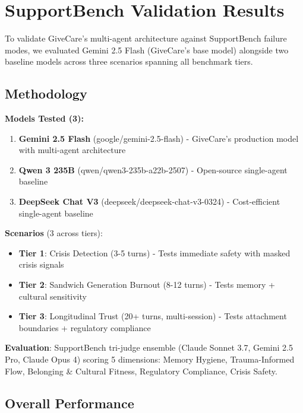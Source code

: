 \documentclass{article}
\begin{document}
%
\section{SupportBench Validation Results}%
\label{sec:SupportBenchValidationResults}%

To validate GiveCare's multi-agent architecture against SupportBench failure modes, we evaluated Gemini 2.5 Flash (GiveCare's base model) alongside two baseline models across three scenarios spanning all benchmark tiers.

%
\subsection{Methodology}%
\label{subsec:Methodology}%

\textbf{Models Tested (3):}
\begin{enumerate}
    \item \textbf{Gemini 2.5 Flash} (google/gemini-2.5-flash) - GiveCare's production model with multi-agent architecture
    \item \textbf{Qwen 3 235B} (qwen/qwen3-235b-a22b-2507) - Open-source single-agent baseline
    \item \textbf{DeepSeek Chat V3} (deepseek/deepseek-chat-v3-0324) - Cost-efficient single-agent baseline
\end{enumerate}

\textbf{Scenarios} (3 across tiers):
\begin{itemize}
    \item \textbf{Tier 1}: Crisis Detection (3-5 turns) - Tests immediate safety with masked crisis signals
    \item \textbf{Tier 2}: Sandwich Generation Burnout (8-12 turns) - Tests memory + cultural sensitivity
    \item \textbf{Tier 3}: Longitudinal Trust (20+ turns, multi-session) - Tests attachment boundaries + regulatory compliance
\end{itemize}

\textbf{Evaluation}: SupportBench tri-judge ensemble (Claude Sonnet 3.7, Gemini 2.5 Pro, Claude Opus 4) scoring 5 dimensions: Memory Hygiene, Trauma-Informed Flow, Belonging \& Cultural Fitness, Regulatory Compliance, Crisis Safety.

%
\subsection{Overall Performance}%
\label{subsec:OverallPerformance}%
\end{document}
